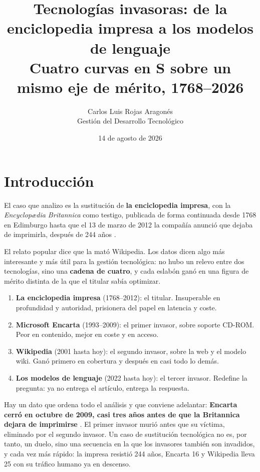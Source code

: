 \documentclass[11pt,letterpaper]{article}
\title{\vspace{-1.2cm}\textbf{Tecnologías invasoras: de la enciclopedia impresa
a los modelos de lenguaje}\\
\large Cuatro curvas en S sobre un mismo eje de mérito, 1768--2026}
\author{Carlos Luis Rojas Aragonés\\
\small Gestión del Desarrollo Tecnológico}
\date{\small 14 de agosto de 2026}
\begin{document}
\maketitle
\vspace{-0.6em}

\section{Introducción}

El caso que analizo es la sustitución de \textbf{la enciclopedia impresa}, con la
\emph{Encyclopædia Britannica} como testigo, publicada de forma continuada desde
1768 en Edimburgo hasta que el 13 de marzo de 2012 la compañía anunció que
dejaba de imprimirla, después de 244 años \parencite{britannica2012,npr2012}.

El relato popular dice que la mató Wikipedia. Los datos dicen algo más
interesante y más útil para la gestión tecnológica: no hubo un relevo entre dos
tecnologías, sino una \textbf{cadena de cuatro}, y cada eslabón ganó en una
figura de mérito distinta de la que el titular sabía optimizar.

\begin{enumerate}
  \item \textbf{La enciclopedia impresa} (1768--2012): el titular. Insuperable en
    profundidad y autoridad, prisionera del papel en latencia y coste.
  \item \textbf{Microsoft Encarta} (1993--2009): el primer invasor, sobre soporte
    CD-ROM. Peor en contenido, mejor en coste y en acceso.
  \item \textbf{Wikipedia} (2001 hasta hoy): el segundo invasor, sobre la web y
    el modelo wiki. Ganó primero en cobertura y después en casi todo lo demás.
  \item \textbf{Los modelos de lenguaje} (2022 hasta hoy): el tercer invasor.
    Redefine la pregunta: ya no entrega el artículo, entrega la respuesta.
\end{enumerate}

Hay un dato que ordena todo el análisis y que conviene adelantar: \textbf{Encarta
cerró en octubre de 2009, casi tres años antes de que la Britannica dejara de
imprimirse} \parencite{techcrunch2009}. El primer invasor murió antes que su
víctima, eliminado por el segundo invasor. Un caso de sustitución tecnológica
no es, por tanto, un duelo, sino una secuencia en la que los invasores también
son invadidos, y cada vez más rápido: la impresa resistió 244 años, Encarta 16 y
Wikipedia lleva 25 con su tráfico humano ya en descenso.
\end{document}

